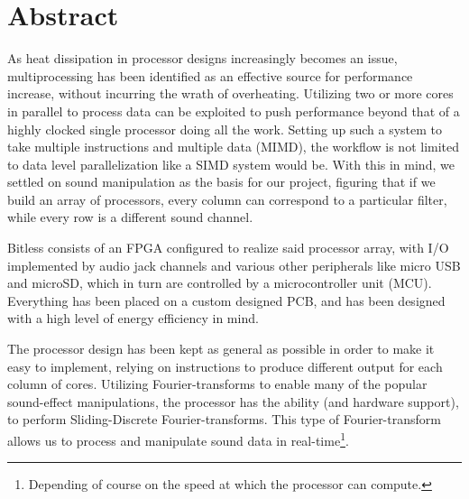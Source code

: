 \section*{Abstract}
As heat dissipation in processor designs increasingly becomes an issue,
multiprocessing has been identified as an effective source for performance
increase, without incurring the wrath of overheating. Utilizing two or more
cores in parallel to process data can be exploited to push performance beyond
that of a highly clocked single processor doing all the work. Setting up such
a system to take multiple instructions and multiple data (MIMD), the workflow
is not limited to data level parallelization like a SIMD system would be. With
this in mind, we settled on sound manipulation as the basis for our project,
figuring that if we build an array of processors, every column can correspond
to a particular filter, while every row is a different sound channel.
\newline

Bitless consists of an FPGA configured to realize said processor array, with
I/O implemented by audio jack channels and various other peripherals like micro
USB and microSD, which in turn are controlled by a microcontroller unit (MCU).
Everything has been placed on a custom designed PCB, and has been designed with
a high level of energy efficiency in mind.
\newline

The processor design has been kept as general as possible in order to make it
easy to implement, relying on instructions to produce different output for each
column of cores. Utilizing Fourier-transforms to enable many of the popular
sound-effect manipulations, the processor has the ability (and hardware
support), to perform Sliding-Discrete Fourier-transforms. This type of
Fourier-transform allows us to process and manipulate sound data in
real-time\footnote{Depending of course on the speed at which the processor can
compute.}.
\newline

